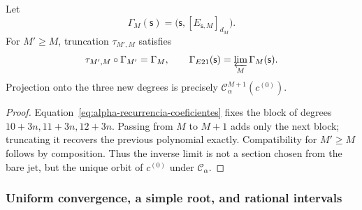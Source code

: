 \begin{proposition}
\label{prop:alpha-naturalidad-recurrencia-explicita}
Let
\[
 \Gamma_M(\mathsf s)
 =\bigl(\mathsf s,[E_{\mathsf s,M}]_{d_M}\bigr).
\]
For \(M'\geq M\), truncation \(\tau_{M',M}\) satisfies
\begin{equation}
 \tau_{M',M}\circ\Gamma_{M'}=\Gamma_M,
 \qquad
 \Gamma_{E21}(\mathsf s)=\varprojlim_M\Gamma_M(\mathsf s).
 \label{eq:alpha-naturalidad-explicita}
\end{equation}
Projection onto the three new degrees is precisely
\(\mathcal C_\alpha^{M+1}(c^{(0)})\).
\end{proposition}

\begin{proof}
Equation~\eqref{eq:alpha-recurrencia-coeficientes} fixes the block of
degrees \(10+3n,11+3n,12+3n\). Passing from \(M\) to \(M+1\) adds only
the next block; truncating it recovers the previous polynomial exactly.
Compatibility for \(M'\geq M\) follows by composition. Thus the inverse
limit is not a section chosen from the bare jet, but the unique orbit
of \(c^{(0)}\) under \(\mathcal C_\alpha\).
\end{proof}

\subsubsection{Uniform convergence, a simple root, and rational intervals}
\label{subsec:alpha-cotas-completas-rev08}

